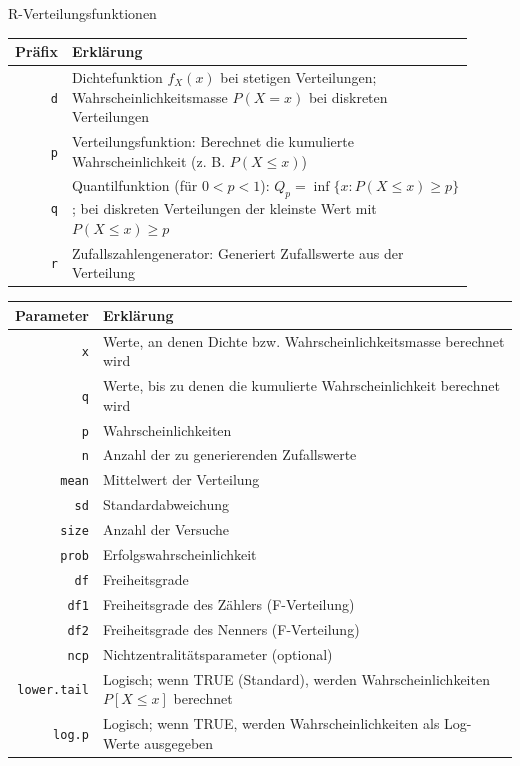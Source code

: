 \begin{formulaBox}{R-Verteilungsfunktionen}{}
\vspace{0.5cm}

\begin{tabular}{@{}rp{0.91\linewidth}@{}}
\toprule
\textbf{Präfix} & \textbf{Erklärung} \\ \midrule
\texttt{d}      & Dichtefunktion \(f_X(x)\) bei stetigen Verteilungen; Wahrscheinlichkeitsmasse \(P(X=x)\) bei diskreten Verteilungen \\
\texttt{p}      & Verteilungsfunktion: Berechnet die kumulierte Wahrscheinlichkeit (z. B. \(P(X \leq x)\)) \\ 
\texttt{q}      & Quantilfunktion (für \(0<p<1\)): \(Q_p=\inf\{x:P(X\leq x)\geq p\}\); bei diskreten Verteilungen der kleinste Wert mit \(P(X\leq x)\geq p\) \\
\texttt{r}      & Zufallszahlengenerator: Generiert Zufallswerte aus der Verteilung \\ 
\bottomrule
\end{tabular}
\label{tab:praefix-erklaerung}

\vspace{0.5cm}
\begin{tabular}{@{}rl@{}}
\toprule
\textbf{Parameter}  & \textbf{Erklärung} \\ \midrule
\texttt{x}          & Werte, an denen Dichte bzw. Wahrscheinlichkeitsmasse berechnet wird \\
\texttt{q}          & Werte, bis zu denen die kumulierte Wahrscheinlichkeit berechnet wird \\
\texttt{p}          & Wahrscheinlichkeiten \\ 
\texttt{n}          & Anzahl der zu generierenden Zufallswerte \\ 
\texttt{mean}       & Mittelwert der Verteilung \\ 
\texttt{sd}         & Standardabweichung \\ 
\texttt{size}       & Anzahl der Versuche \\ 
\texttt{prob}       & Erfolgswahrscheinlichkeit \\ 
\texttt{df}         & Freiheitsgrade \\ 
\texttt{df1}        & Freiheitsgrade des Zählers (F-Verteilung) \\ 
\texttt{df2}        & Freiheitsgrade des Nenners (F-Verteilung) \\ 
\texttt{ncp}        & Nichtzentralitätsparameter (optional) \\ 
\texttt{lower.tail} & Logisch; wenn TRUE (Standard), werden Wahrscheinlichkeiten \( P[X \leq x] \) berechnet \\ 
\texttt{log.p}      & Logisch; wenn TRUE, werden Wahrscheinlichkeiten als Log-Werte ausgegeben \\ 
\bottomrule
\end{tabular}
\end{formulaBox}
